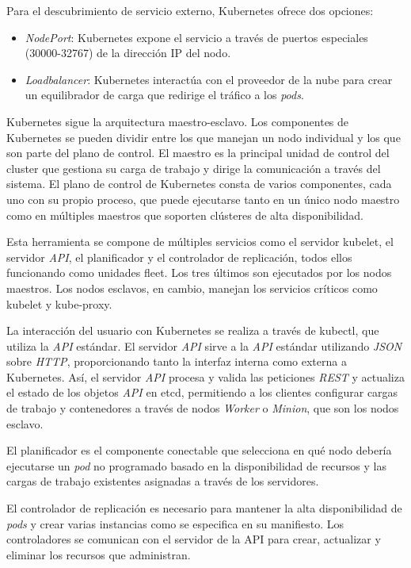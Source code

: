 Para el descubrimiento de servicio externo, Kubernetes ofrece dos opciones:
\begin{itemize}
\item \textit{NodePort}: Kubernetes expone el servicio a través de puertos especiales (30000-32767) de la dirección IP del nodo.
\item \textit{Loadbalancer}: Kubernetes interactúa con el proveedor de la nube para crear un equilibrador de carga que redirige el tráfico a los \textit{pods}.
\end{itemize}

Kubernetes sigue la arquitectura maestro-esclavo. Los componentes de Kubernetes se pueden dividir entre los que manejan un nodo individual y los que son parte del plano de control. El maestro es la principal unidad de control del cluster que gestiona su carga de trabajo y dirige la comunicación a través del sistema. El plano de control de Kubernetes consta de varios componentes, cada uno con su propio proceso, que puede ejecutarse tanto en un único nodo maestro como en múltiples maestros que soporten clústeres de alta disponibilidad.

Esta herramienta se compone de múltiples servicios como el servidor kubelet, el servidor \textit{API}, el planificador y el controlador de replicación, todos ellos funcionando como unidades fleet. Los tres últimos son ejecutados por los nodos maestros. Los nodos esclavos, en cambio, manejan los servicios críticos como kubelet y kube-proxy.

La interacción del usuario con Kubernetes se realiza a través de kubectl, que utiliza la \textit{API} estándar. El servidor \textit{API} sirve a la \textit{API} estándar utilizando \textit{JSON} sobre \textit{HTTP}, proporcionando tanto la interfaz interna como externa a Kubernetes. Así, el servidor \textit{API} procesa y valida las peticiones \textit{REST} y actualiza el estado de los objetos \textit{API} en etcd, permitiendo a los clientes configurar cargas de trabajo y contenedores a través de nodos \textit{Worker} o \textit{Minion}, que son los nodos esclavo. 

El planificador es el componente conectable que selecciona en qué nodo debería ejecutarse un \textit{pod} no programado basado en la disponibilidad de recursos y las cargas de trabajo existentes asignadas a través de los servidores.


El controlador de replicación es necesario para mantener la alta disponibilidad de \textit{pods} y crear varias instancias como se especifica en su manifiesto. Los controladores se comunican con el servidor de la API para crear, actualizar y eliminar los recursos que administran. 

